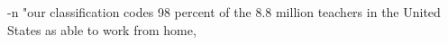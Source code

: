 -n "our classification codes 98 percent of the 8.8 million teachers in the United States as able to work from home,%
